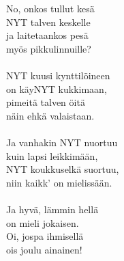 
            No, onkos tullut kesä \\
            NYT talven keskelle \\
            ja laitetaankos pesä \\
            myös pikkulinnuille? \\
\hspace{10mm} \\
            NYT kuusi kynttilöineen \\
            on käyNYT kukkimaan, \\
            pimeitä talven öitä \\
            näin ehkä valaistaan. \\
\hspace{10mm} \\
            Ja vanhakin NYT nuortuu \\
            kuin lapsi leikkimään, \\
            NYT koukkuselkä suortuu, \\
            niin kaikk’ on mielissään. \\
\hspace{10mm} \\
            Ja hyvä, lämmin hellä \\
            on mieli jokaisen. \\
            Oi, jospa ihmisellä \\
            ois joulu ainainen! \\
\hspace{10mm} \\
            \begin{comment} Lisäsäkeistöt: \\
\hspace{10mm} \\
            Lumi on jo peittäNYT \\
            kukat laaksosessa, \\
            järven aalto jäätyNYT  \\
            talvipakkasessa. \\
\hspace{10mm} \\
            Varpunen pienoinen,  \\
            syöNYT kesäeinehen, \\
            järven aalto jäätyNYT  \\
            talvipakkasessa. \\
\end{comment}